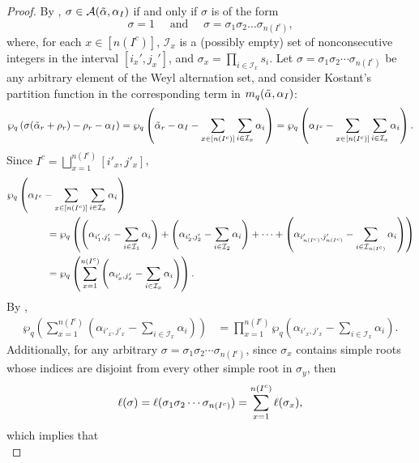 \documentclass[10pt]{article}
\newcommand{\hr}[0]{\Tilde{\alpha}}
\newcommand{\newmu}[0]{\alpha_I}
\newcommand{\thealtset}[0]{\mathcal{A}(\hr,\newmu)}
\newcommand{\qpartition}[1]{\wp_q\left(#1\right)}
\begin{document}
\begin{proof}
    By , $\sigma\in\thealtset$ if and only if $\sigma$ is of the form
    \[\sigma=1 \quad \text{ and } \quad \sigma= \sigma_1\sigma_2\ldots\sigma_{n(I^c)},\]
    where, for each $x\in [n(I^c)]$, $\mathcal{I}_x$ is a (possibly empty) set of nonconsecutive integers in the interval $[i_x',j_x']$, and $\sigma_x=\prod_{i\in\mathcal{I}_x}s_i$. 
    Let $\sigma=\sigma_1\sigma_2\cdots\sigma_{n(I^c)}$ be any arbitrary element of the Weyl alternation set, and consider Kostant's partition function in the corresponding term in $m_q(\hr,\alpha_I)$:
    \begin{equation}
        \qpartition{\sigma(\hr_r+\rho_r)-\rho_r-\alpha_I} = \qpartition{\hr_r - \alpha_{I}-\sum_{x\in[n(I^c)]}\sum_{i\in\mathcal{I}_x}\alpha_i} = \qpartition{\alpha_{I^c}-\sum_{x\in[n(I^c)]}\sum_{i\in\mathcal{I}_x}\alpha_i}.\notag
    \end{equation}
    Since $I^c = \bigsqcup_{x=1}^{n(I^c)}[i'_x,j'_x]$, 
    \begin{align}
        &\qpartition{\alpha_{I^c}-\sum_{x\in[n(I^c)]}\sum_{i\in\mathcal{I}_x}\alpha_i}\notag\\
        &\qquad \qquad = \qpartition{\left(\alpha_{i'_1,j'_1}-\sum_{i\in\mathcal{I}_1}\alpha_i\right)+\left(\alpha_{i'_2,j'_2}-\sum_{i\in\mathcal{I}_2}\alpha_i\right)+\cdots+\left(\alpha_{i'_{n(I^c)},j'_{n(I^c)}}-\sum_{i\in\mathcal{I}_{n(I^c)}}\alpha_i\right)}\notag \\
        &\qquad\qquad = \qpartition{\sum_{x=1}^{n(I^c)}\left(\alpha_{i'_x,j'_x}-\sum_{i\in\mathcal{I}_x}\alpha_i\right)}.\notag
    \end{align}
    By ,
    \begin{align}
        \qpartition{\sum_{x=1}^{n(I^c)}\left(\alpha_{i'_x,j'_x}-\sum_{i\in\mathcal{I}_x}\alpha_i\right)}
        &=\prod_{x=1}^{n(I^c)}\qpartition{\alpha_{i'_x,j'_x}-\sum_{i\in\mathcal{I}_x}\alpha_i}.\label{break into product 1}
    \end{align}
    Additionally, for any arbitrary $\sigma=\sigma_1\sigma_2\cdots\sigma_{n(I^c)}$, since $\sigma_x$ contains simple roots whose indices are disjoint from every other simple root in $\sigma_y$, then
    \begin{equation}
        \ell(\sigma) = \ell(\sigma_1\sigma_2\cdots \sigma_{n(I^c)}) = \sum_{x=1}^{n(I^c)} \ell(\sigma_x),\notag
    \end{equation}
    which implies that
    \begin{equation}

\end{equation}
\end{proof}
\end{document}
